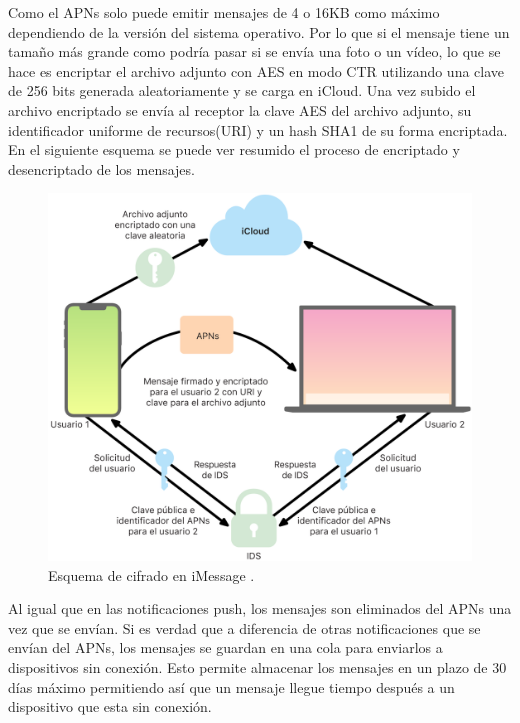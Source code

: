 Como el APNs solo puede emitir mensajes de 4 o 16KB como máximo dependiendo de la versión del sistema operativo. Por lo que si el mensaje tiene un tamaño más grande como podría pasar si se envía una foto o un vídeo, lo que se hace es encriptar el archivo adjunto con AES en modo CTR utilizando una clave de 256 bits generada aleatoriamente y se carga en iCloud. Una vez subido el archivo encriptado se envía al receptor la clave AES del archivo adjunto, su identificador uniforme de recursos(URI) y un hash SHA1 de su forma encriptada.\\
En el siguiente esquema se puede ver resumido el proceso de encriptado y desencriptado de los mensajes.
\begin{figure}[htb]
	\centering
	\includegraphics[scale=0.2]{imagenes/apple.png} 
	\caption{Esquema de cifrado en iMessage \cite{apple1}.}
	\label{iMessagefoto}
\end{figure}

Al igual que en las notificaciones push, los mensajes son eliminados del APNs una vez que se envían. Si es verdad que a diferencia de otras notificaciones que se envían del APNs, los mensajes se guardan en una cola para enviarlos a dispositivos sin conexión. Esto permite almacenar los mensajes en un plazo de 30 días máximo permitiendo así que un mensaje llegue tiempo después a un dispositivo que esta sin conexión.
